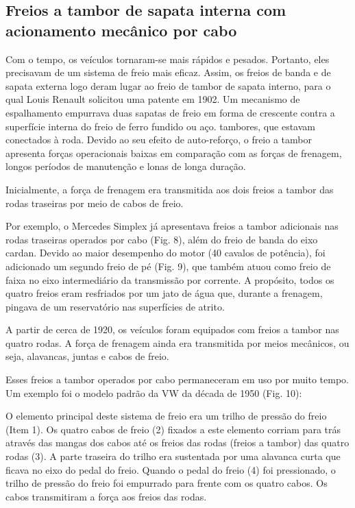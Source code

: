 \subsection{Freios a tambor de sapata interna com acionamento mecânico por cabo} 

Com o tempo, os veículos tornaram-se mais rápidos e pesados. Portanto, eles precisavam de um sistema de freio mais eficaz. Assim, os freios de banda e de sapata externa logo deram lugar ao freio de tambor de sapata interno, para o qual Louis Renault solicitou uma patente em 1902. Um mecanismo de espalhamento empurrava duas sapatas de freio em forma de crescente contra a superfície interna do freio de ferro fundido ou aço. tambores, que estavam conectados à roda. Devido ao seu efeito de auto-reforço, o freio a tambor apresenta forças operacionais baixas em comparação com as forças de frenagem, longos períodos de manutenção e lonas de longa duração. 

Inicialmente, a força de frenagem era transmitida aos dois freios a tambor das rodas traseiras por meio de cabos de freio. 

Por exemplo, o Mercedes Simplex já apresentava freios a tambor adicionais nas rodas traseiras operados por cabo (Fig. 8), além do freio de banda do eixo cardan. Devido ao maior desempenho do motor (40 cavalos de potência), foi adicionado um segundo freio de pé (Fig. 9), que também atuou como freio de faixa no eixo intermediário da transmissão por corrente. A propósito, todos os quatro freios eram resfriados por um jato de água que, durante a frenagem, pingava de um reservatório nas superfícies de atrito. 

A partir de cerca de 1920, os veículos foram equipados com freios a tambor nas quatro rodas. A força de frenagem ainda era transmitida por meios mecânicos, ou seja, alavancas, juntas e cabos de freio.
    
Esses freios a tambor operados por cabo permaneceram em uso por muito tempo. Um exemplo foi o modelo padrão da VW da década de 1950 (Fig. 10): 

O elemento principal deste sistema de freio era um trilho de pressão do freio (Item 1). Os quatro cabos de freio (2) fixados a este elemento corriam para trás através das mangas dos cabos até os freios das rodas (freios a tambor) das quatro rodas (3). A parte traseira do trilho era sustentada por uma alavanca curta que ficava no eixo do pedal do freio. Quando o pedal do freio (4) foi pressionado, o trilho de pressão do freio foi empurrado para frente com os quatro cabos. Os cabos transmitiram a força aos freios das rodas. 

